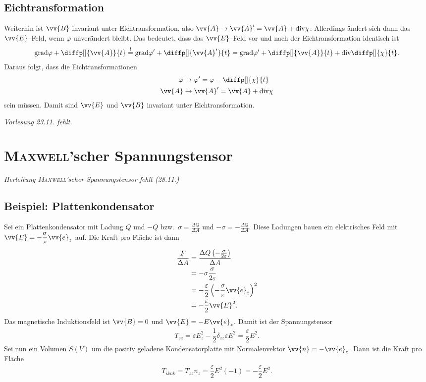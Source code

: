 \documentclass[a4paper,12pt]{article}
\numberwithin{equation}{section}
\begin{document}
\subsection{Eichtransformation}
Weiterhin ist $\vv{B}$ invariant unter Eichtransformation, also $\vv{A}\rightarrow \vv{A}'=\vv{A}+\text{div}\chi$.
Allerdings ändert sich dann das $\vv{E}$--Feld, wenn $\varphi $ unverändert bleibt.
Das bedeutet, dass das $\vv{E}$--Feld vor und nach der Eichtransformation identisch ist
\begin{align} 
        \text{grad}\varphi +\diffp[]{\vv{A}}{t}\stackrel{!}{=}\text{grad}\varphi '+\diffp[]{\vv{A}'}{t}=\text{grad}\varphi '+\diffp[]{\vv{A}}{t}+\text{div}\diffp[]{\chi }{t}
.\end{align} 
Daraus folgt, dass die Eichtransformationen 
\begin{align} 
        \varphi &\rightarrow \varphi '=\varphi -\diffp[]{\chi}{t}\\
        \vv{A}&\rightarrow \vv{A}'=\vv{A}+\text{div}\chi
\end{align} 
sein müssen.
Damit sind $\vv{E}$ und $\vv{B}$ invariant unter Eichtransformation.

\newpage
\textit{Vorlesung 23.11. fehlt.}
\newpage
\section{\textsc{Maxwell}'scher Spannungstensor}
\textit{Herleitung \textsc{Maxwell}'scher Spannungstensor fehlt (28.11.)}
\subsection{Beispiel: Plattenkondensator}
Sei ein Plattenkondensator mit Ladung $Q$ und $-Q$ bzw.\ $\sigma =\tfrac{\Delta Q}{\Delta A}$ und $-\sigma =-\tfrac{\Delta Q}{\Delta A}$. 
Diese Ladungen bauen ein elektrisches Feld mit $\vv{E}=-\dfrac{\sigma }{\varepsilon }\vv{e}_z$ auf.
Die Kraft pro Fläche ist dann
\begin{align} 
        \dfrac{F}{\Delta A}&=\dfrac{\Delta Q\left(-\tfrac{\sigma }{2\varepsilon }\right)}{\Delta A}\\
                           &=-\sigma \dfrac{\sigma }{2\varepsilon }\\
                           &=-\dfrac{\varepsilon }{2}\left(-\dfrac{\sigma }{\varepsilon }\vv{e}_z\right)^2\\
                           &=-\dfrac{\varepsilon }{2}\vv{E}^2
.\end{align} 
Das magnetische Induktionsfeld ist $\vv{B}=0$ und $\vv{E}=-E\vv{e}_z$.
Damit ist der Spannungstensor
\begin{align} 
        T_{z z}=\varepsilon E_z^2-\dfrac{1}{2}\delta _{zz}\varepsilon E^2=\dfrac{\varepsilon }{2}E^2
.\end{align} 
Sei nun ein Volumen $S\left(V\right)$ um die positiv geladene Kondensatorplatte mit Normalenvektor $\vv{n}=-\vv{e}_z$.
Dann ist die Kraft pro Fläche
\begin{align} 
        T_{iknk}=T_{zz}n_z=\dfrac{\varepsilon }{2}E^2\left(-1\right)=-\dfrac{\varepsilon }{2}E^2
.\end{align} 
\end{document}
